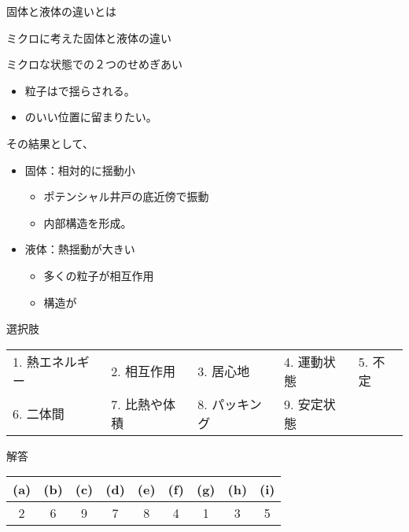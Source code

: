 \documentclass[uplatex,dvipdfmx,a4paper,11pt]{jsarticle}
\begin{document}
\begin{qlist}
\begin{qlist2}
			\qitem 固体と液体の違いとは
				\begin{itembox}[l]{ミクロに考えた固体と液体の違い}
					\begin{itembox}[l]{ミクロな状態での２つのせめぎあい}
						\begin{itemize}
							\item 粒子は\qbox{}で揺らされる。
							\item \qbox{}のいい位置に留まりたい。
						\end{itemize}
					\end{itembox}
					\begin{itembox}[l]{その結果として、}
						\begin{itemize}
							\item 固体：相対的に揺動小
							\begin{itemize}
								\item ポテンシャル井戸の底近傍で振動
								\item 内部構造を形成。
							\end{itemize}
							\item 液体：熱揺動が大きい
							\begin{itemize}
								\item 多くの粒子が相互作用
								\item 構造が\qbox{}
							\end{itemize}
						\end{itemize}
					\end{itembox}
				\end{itembox}

		\end{qlist2}

		\begin{itembox}[l]{選択肢}
			\begin{center}
				\begin{tabular}{lllll}
					1. 熱エネルギー	&2. 相互作用	&3. 居心地	&4. 運動状態	&5. 不定\\
					6. 二体間	&7. 比熱や体積		&8. パッキング	&9. 安定状態
				\end{tabular}
			\end{center}
		\end{itembox}
\end{qlist}

\begin{itembox}[l]{解答}
    \begin{center} 
      \begin{tabular}{|c|c|c|c|c|c|c|c|c|} \hline
        (a) & (b) & (c) & (d) & (e) & (f) & (g) & (h) & (i)\\ \hline
        2 & 6 & 9 & 7 & 8 & 4 & 1 & 3 & 5 \\ \hline		
      \end{tabular}
    \end{center}
\end{itembox}
\end{document}
